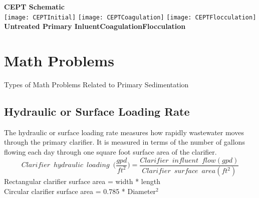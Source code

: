 \vspace{0.6cm}
\hspace{6.8 cm} \textbf{CEPT Schematic}\\
\vspace{0.6cm}
\hspace{1.5 cm}\texttt{[image: CEPTInitial]} \hspace{0.7 cm}\texttt{[image: CEPTCoagulation]}\hspace{0.7 cm}
\texttt{[image: CEPTFlocculation]}\\
\hspace{0.8 cm} \textbf{Untreated Primary Inluent}\hspace{1.6 cm}\textbf{Coagulation}\hspace{2.8 cm}\textbf{Flocculation}\\	
	
	
	
	
	
\section{Math Problems}

Types of Math Problems Related to Primary Sedimentation 


\subsection{Hydraulic or Surface Loading Rate}

The hydraulic or surface loading rate measures how rapidly wastewater moves through the primary clarifier.  It is measured in terms of the number of gallons flowing each day through one square foot surface area of the clarifier. 
$$Clarifier \enspace hydraulic \enspace loading \enspace 	\Big(\dfrac{gpd}{ft^2}\Big) =\dfrac{Clarifier \enspace influent 	\enspace flow (gpd)}{Clarifier \enspace surface \enspace area 	(ft^2)}$$ 
		Rectangular clarifier surface area  = width * length\\
		Circular clarifier surface area  = 0.785 * Diameter$^2 $\\
